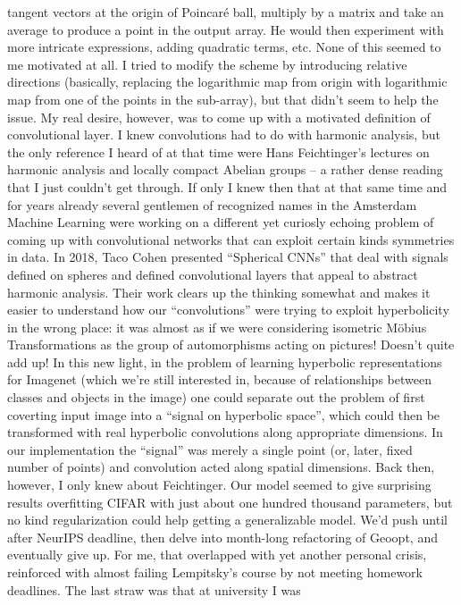 tangent vectors at the origin of Poincar\'e ball, multiply by a matrix and take
an average to produce a point in the output array. He would then experiment
with more intricate expressions, adding quadratic terms, etc. None of this seemed
to me motivated at all. I tried to modify the scheme by introducing relative
directions (basically, replacing the logarithmic map from origin with
logarithmic map from one of the points in the sub-array), but that didn't seem
to help the issue. My real desire, however, was to come up with a motivated
definition of convolutional layer. I knew convolutions had to do with harmonic analysis,
but the only reference I heard of at that time were Hans Feichtinger's lectures
on harmonic analysis and locally compact Abelian groups -- a rather dense
reading that I just couldn't get through. If only I knew then that at that same
time and for years already several gentlemen of recognized names in the
Amsterdam Machine Learning were working on a different yet curiosly echoing
problem of coming up with convolutional networks that can exploit certain kinds
symmetries in data. In 2018, Taco Cohen presented ``Spherical CNNs'' that deal
with signals defined on spheres and defined convolutional layers that appeal to
abstract harmonic analysis. Their work clears up the thinking somewhat and
makes it easier to understand how our ``convolutions'' were trying to exploit
hyperbolicity in the wrong place: it was almost as if we were considering
isometric M\"obius Transformations as the group of automorphisms acting on pictures!
Doesn't quite add up! In this new light, in the problem of learning hyperbolic
representations for Imagenet (which we're still interested in, because of
relationships between classes and objects in the image) one could separate out
the problem of first coverting input image into a ``signal on hyperbolic
space'', which could then be transformed with real hyperbolic convolutions
along appropriate dimensions. In our implementation the ``signal'' was merely a
single point (or, later, fixed number of points) and convolution acted along
spatial dimensions.
Back then, however, I only knew about Feichtinger. Our model seemed to give
surprising results overfitting CIFAR with just about one hundred thousand
parameters, but no kind regularization could help getting a generalizable
model. We'd push until after NeurIPS deadline, then delve into month-long
refactoring of Geoopt, and eventually give up. For me, that overlapped with yet
another personal crisis, reinforced with almost failing Lempitsky's course by
not meeting homework deadlines. The last straw was that at university I was
